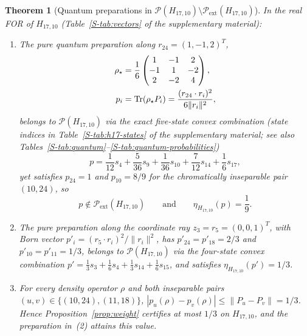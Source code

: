 \documentclass[aps,pra,reprint,superscriptaddress,longbibliography,nofootinbib,floatfix,10pt]{revtex4-2}
\newtheorem{theorem}{Theorem}
\theoremstyle{definition}\newtheorem{definition}[theorem]{Definition}
\theoremstyle{remark}\newtheorem{remark}[theorem]{Remark}
\begin{document}
\begin{theorem}[Quantum preparations in $\mathcal P(H_{17,10})\setminus\mathcal P_{\mathrm{ext}}(H_{17,10})$]\label{thm:quantum}
In the real FOR of $H_{17,10}$ (Table~\ref{S-tab:vectors} of the supplementary material):
\begin{enumerate}
\item The pure quantum preparation along $r_{24}=(1,-1,2)^T$,
\begin{equation}\label{eq:rho}
\begin{aligned}
\rho_\star&=\frac16\begin{pmatrix}1&-1&2\\-1&1&-2\\2&-2&4\end{pmatrix},\\
p_i&=\operatorname{Tr}(\rho_\star P_i)=\frac{(r_{24}\cdot r_i)^2}{6\|r_i\|^2},
\end{aligned}
\end{equation}
belongs to $\mathcal P(H_{17,10})$ via the exact five-state convex combination (state indices in Table~\ref{S-tab:h17-states} of the supplementary material; see also Tables~\ref{S-tab:quantum}--\ref{S-tab:quantum-probabilities})
\begin{equation}\label{eq:mixture}
p=\frac{1}{12}s_4+\frac{5}{36}s_9+\frac{1}{36}s_{10}+\frac{7}{12}s_{14}+\frac{1}{6}s_{17},
\end{equation}
yet satisfies $p_{24}=1$ and $p_{10}=8/9$ for the chromatically inseparable pair $(10,24)$, so
\begin{equation}\label{eq:quantum-gap}
p\notin\mathcal P_{\mathrm{ext}}(H_{17,10})\qquad\text{and}\qquad \eta_{H_{17,10}}(p)=\frac19.
\end{equation}
\item The pure preparation along the coordinate ray $z_3=r_5=(0,0,1)^T$, with Born vector $p'_i=(r_5\cdot r_i)^2/\|r_i\|^2$, has $p'_{24}=p'_{18}=2/3$ and $p'_{10}=p'_{11}=1/3$, belongs to $\mathcal P(H_{17,10})$ via the four-state convex combination $p'=\frac13 s_3+\frac16 s_4+\frac13 s_{14}+\frac16 s_{15}$, and satisfies $\eta_{H_{17,10}}(p')=1/3$.
\item For every density operator $\rho$ and both inseparable pairs $(u,v)\in\{(10,24),(11,18)\}$, $|p_u(\rho)-p_v(\rho)|\le\|P_u-P_v\|=1/3$. Hence Proposition~\ref{prop:weight} certifies at most $1/3$ on $H_{17,10}$, and the preparation in~(2) attains this value.
\end{enumerate}
\end{theorem}
\end{document}
